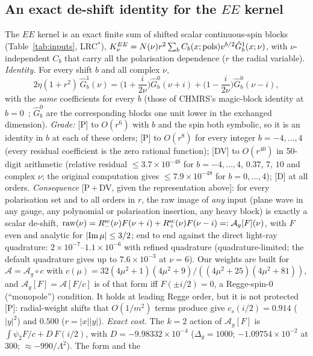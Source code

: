 \documentclass[aps,prl,onecolumn,superscriptaddress,nofootinbib]{revtex4-2}
\begin{document}
\subsection{An exact de-shift identity for the $EE$ kernel}
The $EE$ kernel is an exact finite sum of shifted scalar continuous-spin blocks (Table~\ref{tab:inputs}, LRC$^*$),
$K^{EE}_\nu=N(\nu)r^2\sum_bC_b(x;{\rm pols})v^{b/2}\hat G^1_b(x;\nu)$, with $\nu$-independent $C_b$ that carry all the
polarisation dependence ($r$ the radial variable). \emph{Identity.} For every shift $b$ and all complex $\nu$,
\begin{equation}
2\eta(1+r^2)\,\hat G^1_b(\nu)=\Big(1+\frac{i}{2\nu}\Big)\hat G^0_b(\nu+i)+\Big(1-\frac{i}{2\nu}\Big)\hat G^0_b(\nu-i),
\label{eq:magic}
\end{equation}
with the \emph{same} coefficients for every $b$ (those of CHMRS's magic-block identity at $b=0$~\cite{CHMRS};
$\hat G^{0}_b$ are the corresponding blocks one unit lower in the exchanged dimension). \emph{Grade:} [P] to $O(r^6)$ with
$b$ and the spin both symbolic, so it is an identity in $b$ at each of these orders; [P] to $O(r^8)$ for every integer
$b=-4,\dots,4$ (every residual coefficient is the zero rational function); [DV] to $O(r^{40})$ in 50-digit arithmetic
(relative residual $\le3.7\times10^{-48}$ for $b=-4,\dots,4$, $0.37$, $7$, $10$ and complex $\nu$; the original computation
gives $\le7.9\times10^{-48}$ for $b=0,\dots,4$); [D] at all orders. \emph{Consequence} [P\,+\,DV, given the
representation above]: for every polarisation set and to all orders in $r$, the raw image of \emph{any} input (plane
wave in any gauge, any polynomial or polarisation insertion, any heavy block) is exactly a scalar de-shift,
${\rm raw}(\nu)=R^{\rm sc}_-(\nu)F(\nu+i)+R^{\rm sc}_+(\nu)F(\nu-i)=:\mathcal A_g[F](\nu)$, with $F$ even and analytic for
$|{\rm Im}\,\mu|\le3/2$; end to end against the direct light-ray quadrature: $2\times10^{-7}$--$1.1\times10^{-6}$
with refined quadrature (quadrature-limited; the default quadrature gives up to $7.6\times10^{-3}$ at $\nu=6$). Our weights are built for $\mathcal A=\mathcal A_g\circ c$ with
$c(\mu)=32(4\mu^2+1)(4\mu^2+9)/((4\mu^2+25)(4\mu^2+81))$, and $\mathcal A_g[F]=\mathcal A[F/c]$ is of that form iff
$F(\pm i/2)=0$, a Regge-spin-0 (``monopole'') condition. It holds at leading Regge order, but it is not protected
[P]: radial-weight shifts that $O(1/m^2)$ terms produce give $c_s(i/2)=0.914$ ($|y|^2$) and $0.500$ ($r=|x||y|$).
\emph{Exact cost.} The $k=2$ action of $\mathcal A_g[F]$ is $\int\psi_2F/c+D\,F(i/2)$, with
$D=-9.98332\times10^{-4}$ ($\Delta_g=1000$; $-1.09754\times10^{-2}$ at 300; $\approx-990/\Lambda^2$). The form and the
\end{document}
